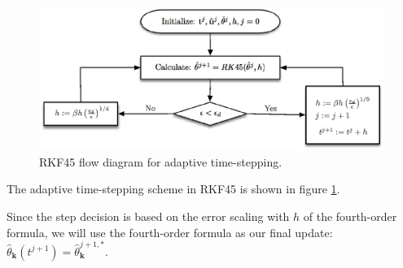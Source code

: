 \documentclass[12pt]{article}
\begin{document}
\begin{figure}
	\centering
	\includegraphics[width=1.0\textwidth]{RK45.eps}
	\caption{RKF45 flow diagram for adaptive time-stepping.}
	\label{fig:RKF45}
\end{figure}
The adaptive time-stepping scheme in RKF45 is shown in figure \ref{fig:RKF45}. 

Since the step decision is based on the error scaling with $h$ of the fourth-order formula, we will use the fourth-order formula as our final update: $\hat{\theta}_{\mathbf{k}}(t^{j+1})=\hat{\theta}_{\mathbf{k}}^{j+1,*}$.
\end{document}
